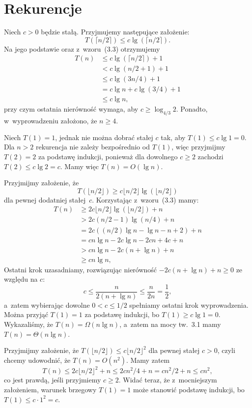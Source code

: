 \chapter{Rekurencje}


\exercise %
Niech $c>0$ będzie stałą. Przyjmujemy następujące założenie:
\[
	T(\lceil n/2\rceil) \le c\lg(\lceil n/2\rceil).
\]
Na jego podstawie oraz z~wzoru~(3.3) otrzymujemy
\begin{align*}
	T(n) &\le c\lg(\lceil n/2\rceil)+1 \\
	&< c\lg(n/2+1)+1 \\
	&\le c\lg(3n/4)+1 \\
	&= c\lg n+c\lg(3/4)+1 \\
	&\le c\lg n,
\end{align*}
przy czym ostatnia nierówność wymaga, aby $c\ge\log_{4/3}2$. Ponadto, w~wyprowadzeniu założono, że $n\ge4$.

Niech $T(1)=1$, jednak nie można dobrać stałej $c$ tak, aby $T(1)\le c\lg1=0$. Dla $n>2$ rekurencja nie zależy bezpośrednio od $T(1)$, więc przyjmijmy $T(2)=2$ za podstawę indukcji, ponieważ dla dowolnego $c\ge2$ zachodzi $T(2)\le c\lg 2=c$. Mamy więc $T(n)=O(\lg n)$.

\exercise %
Przyjmijmy założenie, że
\[
	T(\lfloor n/2\rfloor) \ge c\lfloor n/2\rfloor\lg(\lfloor n/2\rfloor)
\]
dla pewnej dodatniej stałej~$c$. Korzystając z~wzoru~(3.3) mamy:
\begin{align*}
	T(n) &\ge 2c\lfloor n/2\rfloor\lg(\lfloor n/2\rfloor)+n \\
	&> 2c(n/2-1)\lg(n/4)+n \\
	&= 2c((n/2)\lg n-\lg n-n+2)+n \\
	&= cn\lg n-2c\lg n-2cn+4c+n \\
	&> cn\lg n-2c(n+\lg n)+n \\
	&\ge cn\lg n,
\end{align*}
Ostatni krok uzasadniamy, rozwiązując nierówność $-2c(n+\lg n)+n\ge0$ ze względu na $c$:
\[
	c \le \frac{n}{2(n+\lg n)} \le \frac{n}{2n} = \frac{1}{2},
\]
a~zatem wybierając dowolne $0<c\le1/2$ spełniamy ostatni krok wyprowadzenia. Można przyjąć $T(1)=1$ za podstawę indukcji, bo $T(1)\ge c\lg1=0$. Wykazaliśmy, że $T(n)=\Omega(n\lg n)$, a~zatem na mocy tw.~3.1 mamy $T(n)=\Theta(n\lg n)$.

\exercise %
Przyjmijmy założenie, że $T(\lfloor n/2\rfloor)\le c\lfloor n/2\rfloor^2$ dla pewnej stałej $c>0$, czyli chcemy udowodnić, że $T(n)=O(n^2)$. Mamy zatem
\[
	T(n) \le 2c\lfloor n/2\rfloor^2+n \le 2cn^2\!/4 + n = cn^2\!/2+n \le cn^2,
\]
co jest prawdą, jeśli przyjmiemy $c\ge2$. Widać teraz, że z~mocniejszym założeniem, warunek brzegowy $T(1)=1$ może stanowić podstawę indukcji, bo $T(1)\le c\cdot1^2=c$.

